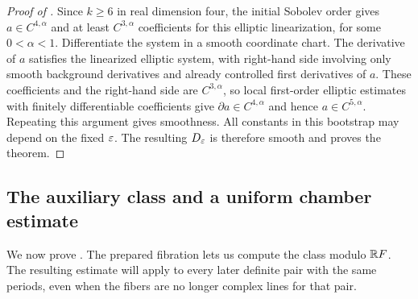 \begin{proof}[Proof of ]
Since $k\geq6$ in real dimension four, the initial Sobolev order gives
$a\in C^{4,\alpha}$ and at least $C^{3,\alpha}$ coefficients
for this elliptic linearization, for some $0<\alpha<1$.
Differentiate the system in a smooth coordinate chart.  The
derivative of $a$ satisfies the linearized elliptic system, with
right-hand side involving only smooth background derivatives and
already controlled first derivatives of $a$.  These coefficients and
the right-hand side are $C^{3,\alpha}$, so local first-order elliptic
estimates with finitely differentiable coefficients
\cite[Section~4, Theorem~4.3]{TaylorNonlinearEllipticNotes}
give $\partial a\in C^{4,\alpha}$ and hence
$a\in C^{5,\alpha}$.  Repeating this argument gives smoothness.
All constants in this bootstrap may depend on the fixed $\varepsilon$.
The resulting $D_\varepsilon$ is therefore smooth and proves the theorem.
\end{proof}

\subsection{The auxiliary class and a uniform chamber estimate}

We now prove .  The prepared fibration lets
us compute the class modulo $\mathbb R F$.  The resulting estimate will apply
to every later definite pair with the same periods, even when the fibers
are no longer complex lines for that pair.

